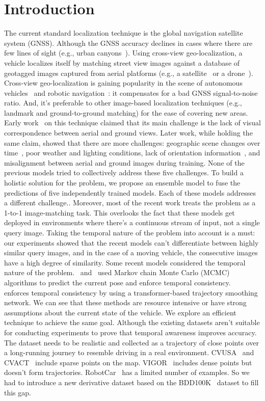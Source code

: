 \documentclass[10pt,letterpaper]{article}
\begin{document}
\linenumbers

\section*{Introduction}
The current standard localization technique is the global navigation satellite system (GNSS). Although the GNSS accuracy declines in cases where there are few lines of sight (e.g., urban canyons~\cite{bib1}). Using cross-view geo-localization, a vehicle localizes itself by matching street view images against a database of geotagged images captured from aerial platforms (e.g., a satellite~\cite{bib2} or a drone~\cite{bib3}). Cross-view geo-localization is gaining popularity in the scene of autonomous vehicles~\cite{bib2} and robotic navigation~\cite{bib25}: it compensates for a bad GNSS signal-to-noise ratio. And,  it’s preferable to other image-based localization techniques (e.g., landmark and ground-to-ground matching) for the ease of covering new areas. Early work~\cite{bib37} on this technique claimed that its main challenge is the lack of visual correspondence between aerial and ground views. Later work, while holding the same claim, showed that there are more challenges: geographic scene changes over time~\cite{bib6,bib7,bib8,bib9,bib10}, poor weather and lighting conditions, lack of orientation information~\cite{bib4}, and misalignment between aerial and ground images during training.
None of the previous models tried to collectively address these five challenges. To build a holistic solution for the problem, we propose an ensemble model to fuse the predictions of five independently trained models. Each of these models addresses a different challenge..
Moreover, most of the recent work treats the problem as a 1-to-1 image-matching task. This overlooks the fact that these models get deployed in environments where there's a continuous stream of input, not a single query image. Taking the temporal nature of the problem into account is a must:  our experiments showed that the recent models can't differentiate between highly similar query images, and in the case of a moving vehicle, the consecutive images have a high degree of similarity. Some recent models considered the temporal nature of the problem.~\cite{bib7}  and~\cite{bib20,bib21,bib22} used Markov chain Monte Carlo (MCMC) algorithms to predict the current pose and enforce temporal consistency.~\cite{bib24} enforces temporal consistency by using a transformer-based trajectory smoothing network. We can see that these methods are resource intensive or have strong assumptions about the current state of the vehicle. We explore an efficient technique to achieve the same goal.
Although the existing datasets aren't suitable for conducting experiments to prove that temporal awareness improves accuracy. The dataset needs to be realistic and collected as a trajectory of close points over a long-running journey to resemble driving in a real environment.  CVUSA~\cite{bib55} and CVACT~\cite{bib4} include sparse points on the map. VIGOR~\cite{bib5} includes dense points but doesn't form trajectories. RobotCar~\cite{bib6} has a limited number of examples. So we had to introduce a new derivative dataset based on the BDD100K~\cite{bib12} dataset to fill this gap.
\end{document}
